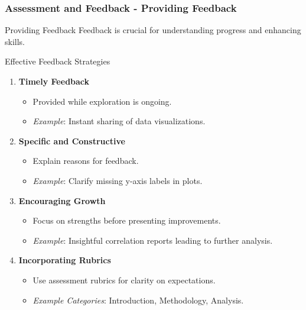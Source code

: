 \documentclass[aspectratio=169]{beamer}
\begin{document}
\begin{frame}[fragile]
    \frametitle{Assessment and Feedback - Providing Feedback}
    \begin{block}{Providing Feedback}
        Feedback is crucial for understanding progress and enhancing skills.
    \end{block}
    
    \begin{block}{Effective Feedback Strategies}
        \begin{enumerate}
            \item \textbf{Timely Feedback}
            \begin{itemize}
                \item Provided while exploration is ongoing.
                \item \textit{Example}: Instant sharing of data visualizations.
            \end{itemize}
            
            \item \textbf{Specific and Constructive}
            \begin{itemize}
                \item Explain reasons for feedback.
                \item \textit{Example}: Clarify missing y-axis labels in plots.
            \end{itemize}
            
            \item \textbf{Encouraging Growth}
            \begin{itemize}
                \item Focus on strengths before presenting improvements.
                \item \textit{Example}: Insightful correlation reports leading to further analysis.
            \end{itemize}
            
            \item \textbf{Incorporating Rubrics}
            \begin{itemize}
                \item Use assessment rubrics for clarity on expectations.
                \item \textit{Example Categories}: Introduction, Methodology, Analysis.
            \end{itemize}
        \end{enumerate}
    \end{block}
\end{frame}
\end{document}
